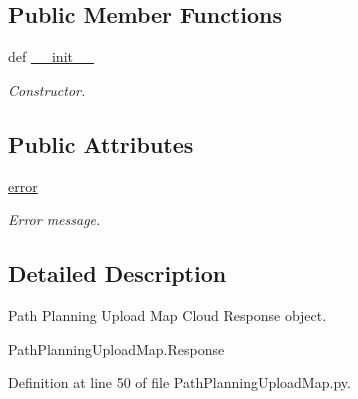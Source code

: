 \subsection*{Public Member Functions}
\begin{DoxyCompactItemize}
\item 
def \hyperlink{classRappCloud_1_1CloudMsgs_1_1PathPlanningUploadMap_1_1PathPlanningUploadMap_1_1Response_ab64d5fa552c25d5704613a3877d0dc9c}{\-\_\-\-\_\-init\-\_\-\-\_\-}
\begin{DoxyCompactList}\small\item\em Constructor. \end{DoxyCompactList}\end{DoxyCompactItemize}
\subsection*{Public Attributes}
\begin{DoxyCompactItemize}
\item 
\hyperlink{classRappCloud_1_1CloudMsgs_1_1PathPlanningUploadMap_1_1PathPlanningUploadMap_1_1Response_a0d6b31fb1e7584f13b9d27783203035f}{error}
\begin{DoxyCompactList}\small\item\em Error message. \end{DoxyCompactList}\end{DoxyCompactItemize}


\subsection{Detailed Description}
\begin{DoxyVerb}Path Planning Upload Map Cloud Response object.

PathPlanningUploadMap.Response
\end{DoxyVerb}
 

Definition at line 50 of file Path\-Planning\-Upload\-Map.\-py.



